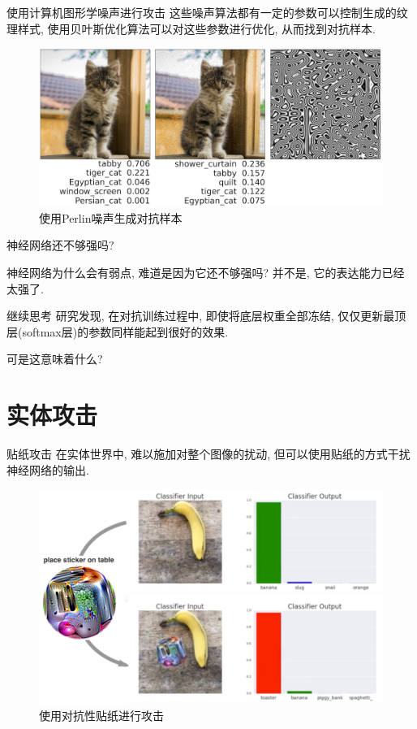 \documentclass[UTF8, aspectratio=169, 10pt, t]{ctexbeamer}
\begin{document}
\begin{frame}{使用计算机图形学噪声进行攻击}
	这些噪声算法都有一定的参数可以控制生成的纹理样式, 使用贝叶斯优化算法可以对这些参数进行优化, 从而找到对抗样本.
	\begin{figure}
		\centering
		\includegraphics[width=0.7\linewidth]{noise}
		\caption{使用Perlin噪声生成对抗样本}
		\label{fig:noise}
	\end{figure}
	
\end{frame}

\begin{frame}{神经网络还不够强吗?}

			神经网络为什么会有弱点, 难道是因为它还不够强吗? 并不是, 它的表达能力已经太强了.
			
			\vspace{2em}
			
			\begin{block}{继续思考}
				研究发现, 在对抗训练过程中, 即使将底层权重全部冻结, 仅仅更新最顶层(softmax层)的参数同样能起到很好的效果.
			\end{block}
		
			可是这意味着什么?
			

	
\end{frame}

\section{实体攻击}

\begin{frame}{贴纸攻击}
	在实体世界中, 难以施加对整个图像的扰动, 但可以使用贴纸的方式干扰神经网络的输出.
	\begin{figure}
		\centering
		\includegraphics[width=0.6\linewidth]{phy3}
		\caption{使用对抗性贴纸进行攻击}
		\label{fig:phy3}
	\end{figure}
	
\end{frame}
\end{document}
